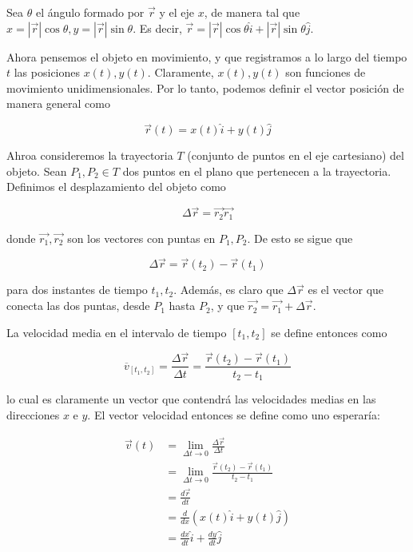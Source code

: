 \documentclass[12pt]{article}
\theoremstyle{definition}
\begin{document}
Sea $\theta$ el ángulo formado por $\vec{r}$ y el eje $x$, de manera tal que $x
= \left| \vec{r} \right| \cos \theta, y = \left| \vec{r} \right| \sin \theta$.
Es decir, $\vec{r} = \left| \vec{r} \right| \cos \theta \hat{i} + \left|
\vec{r}\right| \sin \theta \hat{j} $.

Ahora pensemos el objeto en movimiento, y que registramos a lo largo del tiempo
$t$ las posiciones $x(t), y(t)$. Claramente, $x(t), y(t)$ son funciones de
movimiento unidimensionales. Por lo tanto, podemos definir el vector posición de
manera general como 

\begin{equation}
    \vec{r}(t) = x(t)\hat{i} + y(t) \hat{j}
\end{equation}

Ahroa consideremos la trayectoria $T$ (conjunto de puntos en el eje cartesiano)
del objeto. Sean $P_1, P_2 \in T$ dos puntos en el plano que pertenecen a la
trayectoria. Definimos el desplazamiento del objeto como 

\begin{equation}
    \Delta \vec{r} = \vec{r_2} \vec{r_1}
\end{equation}

donde $\vec{r_1}, \vec{r_2}$ son los vectores con puntas en $P_1, P_2$. De esto
se sigue que 


\begin{equation}
    \Delta \vec{r} = \vec{r}(t_2) - \vec{r}(t_1)
\end{equation}


para dos instantes de tiempo $t_1, t_2$. Además, es claro que $\Delta\vec{r}$ es
el vector que conecta las dos puntas, desde $P_1$ hasta $P_2$, y que $\vec{r_2}
= \vec{r_1} + \Delta \vec{r}$. 

La velocidad media en el intervalo de tiempo $[t_1, t_2]$ se define entonces
como 

\begin{equation}
    \overline{v}_{[t_1, t_2]} = \frac{\Delta \vec{r}}{\Delta t} = 
    \frac{\vec{r}(t_2)-  \vec{r}(t_1)}{t_2 - t_1}
\end{equation}

lo cual es claramente un vector que contendrá las velocidades medias en las
direcciones $x$ e $y$. El vector velocidad entonces se define como uno
esperaría: 

\begin{align}
    \vec{v}(t) 
    &= \lim_{\Delta t \to 0}  \frac{\Delta \vec{r}}{\Delta t}  \\
    &= \lim_{\Delta t \to 0} \frac{\vec{r}(t_2)-  \vec{r}(t_1)}{t_2 - t_1}
    \nonumber \\
    &= \frac{d \vec{r}}{dt} \nonumber \\ 
    &= \frac{d}{dx} \left( x(t)\hat{i} + y(t) \hat{j} \right) \nonumber\\ 
    &= \frac{dx}{dt} \hat{i} + \frac{dy}{dt} \hat{j} \nonumber
\end{align}
\end{document}
